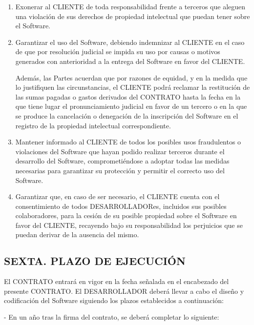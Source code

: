 \documentclass[a4paper,11pt]{report}
\begin{document}
	\begin{enumerate}[label=\Alph*)]
		\item Exonerar al CLIENTE de toda responsabilidad frente a terceros que
		aleguen una violación de sus derechos de propiedad intelectual que
		puedan tener sobre el Software.

		\item Garantizar el uso del Software, debiendo indemnizar al CLIENTE en el
		caso de que por resolución judicial se impida su uso por causas o
		motivos generados con anterioridad a la entrega del Software en favor
		del CLIENTE.

		Además, las Partes acuerdan que por razones de equidad, y en la medida
		que lo justifiquen las circunstancias, el CLIENTE podrá reclamar la
		restitución de las sumas pagadas o gastos derivados del CONTRATO hasta
		la fecha en la que tiene lugar el pronunciamiento judicial en favor de
		un tercero o en la que se produce la cancelación o denegación de la
		inscripción del Software en el registro de la propiedad intelectual
		correspondiente.

		\item Mantener informado al CLIENTE de todos los posibles usos fraudulentos
		o violaciones del Software que hayan podido realizar terceros durante el
		desarrollo del Software, comprometiéndose a adoptar todas las medidas
		necesarias para garantizar su protección y permitir el correcto uso del
		Software.

		\item Garantizar que, en caso de ser necesario, el CLIENTE cuenta con el
		consentimiento de todos DESARROLLADORes, incluidos sus posibles
		colaboradores, para la cesión de su posible propiedad sobre el Software
		en favor del CLIENTE, recayendo bajo su responsabilidad los perjuicios
		que se puedan derivar de la ausencia del mismo.

	\end{enumerate}

	\subsection*{SEXTA. PLAZO DE EJECUCIÓN}

	El CONTRATO entrará en vigor en la fecha señalada en el encabezado del
	presente CONTRATO. El DESARROLLADOR deberá llevar a cabo el diseño y
	codificación del Software siguiendo los plazos establecidos a
	continuación:

	- En un año tras la firma del contrato, se deberá completar lo siguiente:
\end{document}
